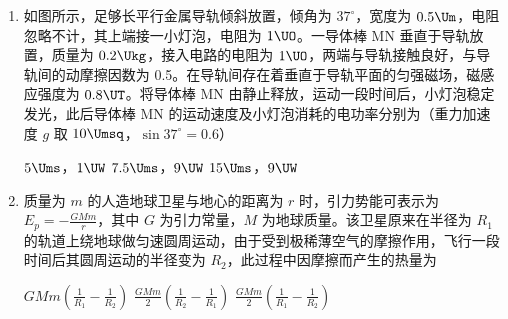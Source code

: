 \documentclass[\gkver]{gaokaozhenti}
\begin{document}
\begin{enumerate}
{正确选项：B
}

\item
如图所示，足够长平行金属导轨倾斜放置，倾角为 $37^{\circ}$，宽度为 $0.5\Um$，电阻忽略不计，其上端接一小灯泡，电阻为 $1\UO$。一导体棒 MN 垂直于导轨放置，质量为 $0.2\Ukg$，接入电路的电阻为 $1\UO$，两端与导轨接触良好，与导轨间的动摩擦因数为 0.5。在导轨间存在着垂直于导轨平面的匀强磁场，磁感应强度为 $0.8\UT$。将导体棒 MN 由静止释放，运动一段时间后，小灯泡稳定发光，此后导体棒 MN 的运动速度及小灯泡消耗的电功率分别为（重力加速度 $g$ 取 $10\Umsq$，$\sin37^{\circ}=0.6$）


{$5\Ums$，$1\UW$}
{$7.5\Ums$，$9\UW$}
{$15\Ums$，$9\UW$}


\item
质量为 $m$ 的人造地球卫星与地心的距离为 $r$ 时，引力势能可表示为 $E_{p}=-\frac{GMm}{r}$，其中 $G$ 为引力常量，$M$ 为地球质量。该卫星原来在半径为 $R_{1}$ 的轨道上绕地球做匀速圆周运动，由于受到极稀薄空气的摩擦作用，飞行一段时间后其圆周运动的半径变为 $R_{2}$，此过程中因摩擦而产生的热量为

{$GMm(\frac{1}{R_1}-\frac{1}{R_2})$}
{$\frac{GMm}{2}(\frac{1}{R_2}-\frac{1}{R_1})$}
{$\frac{GMm}{2}(\frac{1}{R_1}-\frac{1}{R_2})$}

\end{enumerate}
\end{document}
